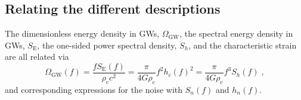 \subsection{Relating the different descriptions}
The dimensionless energy density in GWs, $\Omega_{\mathrm{GW}}$, the spectral energy density in GWs, $S_{\mathrm{E}}$, the one-sided power spectral density, $S_{h}$, and the characteristic strain are all related via
\begin{equation}\label{eq:omega} 
\Omega_{\mathrm{GW}}(f)=\frac{fS_{\mathrm{E}}(f)}{\rho_{\mathrm{c}}c^{2}}=\frac{\pi}{4G\rho_{\mathrm{c}}}f^{2}h_{c}(f)^{2}=\frac{\pi}{4G\rho_{\mathrm{c}}}f^{3}S_{h}(f)  \; ,
\end{equation}
and corresponding expressions for the noise with $S_{n}(f)$ and $h_{n}(f)$. 

